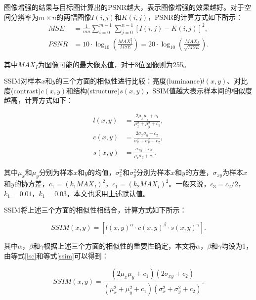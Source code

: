 \documentclass[
    type = master, %
    degree = academic,        %
    decl-page,  %
  ]{njuthesis}
\begin{document}
图像增强的结果与目标图计算出的PSNR越大，表示图像增强的效果越好。对于空间分辨率为$m\times n$的两幅图像$I(i, j)$和$K(i, j)$，PSNR的计算方式如下所示：
\begin{equation}
\begin{align}
M S E&=\frac{1}{m n} \sum_{i=0}^{m-1} \sum_{j=0}^{n-1}[I(i, j)-K(i, j)]^2 ,\\
P S N R&=10 \cdot \log _{10}\left(\frac{M A X_I^2}{M S E}\right)=20 \cdot \log _{10}\left(\frac{M A X_I}{\sqrt{M S E}}\right).
\end{align}
\end{equation}

其中$MAX_I$为图像可能的最大像素值，对于8位图像则为255。

SSIM对样本$x$和$y$的三个方面的相似性进行比较：亮度(luminance)\enspace $l(x, y)$、对比度(contrast)\enspace $c(x, y)$和结构(structure)\enspace $s(x, y)$，SSIM值越大表示样本间的相似度越高，计算方式如下：

\begin{equation}\label{lsc}
\begin{align*}
l(x, y)&=\frac{2 \mu_x \mu_y+c_1}{\mu_x^2+\mu_y^2+c_1}, \\
c(x, y)&=\frac{2 \sigma_x \sigma_y+c_2}{\sigma_x^2+\sigma_y^2+c_2}, \\
s(x, y)&=\frac{\sigma_{x y}+c_3}{\rho_x \sigma_y+c_3} .
\end{align*}
\end{equation}

其中$\mu_x$和$\mu_y$分别为样本$x$和$y$的均值，$\sigma_x^2$和$\sigma_y^2$分别为样本$x$和$y$的方差，$\sigma_{x y}$为样本$x$和$y$的协方差，$c_1=(k_1 MAX_I)^2$，$c_1=(k_2 MAX_I)^2$。一般来说，$c_3=c_2/2$，$k_1=0.01$，$k_1=0.03$，本文也采用上述默认值。

SSIM将上述三个方面的相似性相结合，计算方式如下所示：

\begin{equation}\label{ssim}
SSIM(x, y)=\left[l(x, y)^\alpha \cdot c(x, y)^\beta \cdot s(x, y)^\gamma\right].
\end{equation}

其中$\alpha$，$\beta$和$\gamma$根据上述三个方面的相似性的重要性确定，本文将$\alpha$，$\beta$和$\gamma$均设为1，由等式\ref{lsc}和等式\ref{ssim}可以得到：

\begin{equation}
SSIM(x, y)=\frac{\left(2 \mu_x \mu_y+c_1\right)\left(2 \sigma_{x y}+c_2\right)}{\left(\mu_x^2+\mu_y^2+c_1\right)\left(\sigma_x^2+\sigma_y^2+c_2\right)}.
\end{equation}
\end{document}
